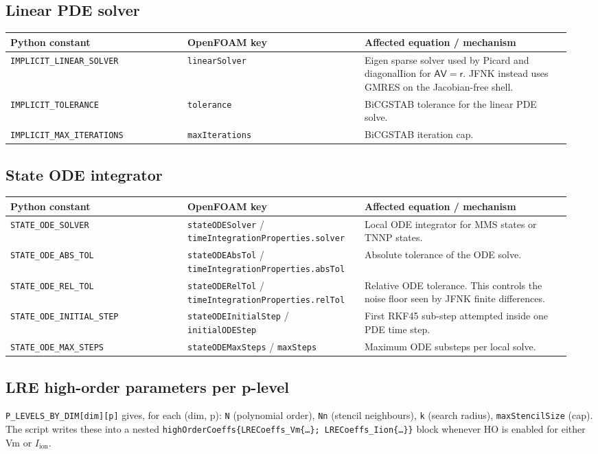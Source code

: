 \documentclass[11pt,a4paper]{article}
\newcommand{\Iion}{I_{\text{ion}}}
\newcommand{\Aimp}{\mathsf{A}}
\newcommand{\code}[1]{\texttt{\small #1}}
\begin{document}
\subsection{Linear PDE solver}
\begin{longtable}{@{}p{0.30\linewidth}p{0.30\linewidth}p{0.35\linewidth}@{}}
\toprule
Python constant & OpenFOAM key & Affected equation / mechanism \\
\midrule \endhead
\code{IMPLICIT\_LINEAR\_SOLVER} & \code{linearSolver} &
   Eigen sparse solver used by Picard and diagonalIion for
   $\Aimp\mathsf{V}=\mathsf{r}$. JFNK instead uses GMRES on the
   Jacobian-free shell. \\
\code{IMPLICIT\_TOLERANCE} & \code{tolerance} &
   BiCGSTAB tolerance for the linear PDE solve. \\
\code{IMPLICIT\_MAX\_ITERATIONS} & \code{maxIterations} &
   BiCGSTAB iteration cap. \\
\bottomrule
\end{longtable}

\subsection{State ODE integrator}
\begin{longtable}{@{}p{0.30\linewidth}p{0.30\linewidth}p{0.35\linewidth}@{}}
\toprule
Python constant & OpenFOAM key & Affected equation / mechanism \\
\midrule \endhead
\code{STATE\_ODE\_SOLVER} & \code{stateODESolver} /
   \code{timeIntegrationProperties.solver} &
   Local ODE integrator for MMS states or TNNP states. \\
\code{STATE\_ODE\_ABS\_TOL} & \code{stateODEAbsTol} /
   \code{timeIntegrationProperties.absTol} &
   Absolute tolerance of the ODE solve. \\
\code{STATE\_ODE\_REL\_TOL} & \code{stateODERelTol} /
   \code{timeIntegrationProperties.relTol} &
   Relative ODE tolerance. This controls the noise floor seen by JFNK
   finite differences. \\
\code{STATE\_ODE\_INITIAL\_STEP} & \code{stateODEInitialStep} /
   \code{initialODEStep} &
   First RKF45 sub-step attempted inside one PDE time step. \\
\code{STATE\_ODE\_MAX\_STEPS} & \code{stateODEMaxSteps} /
   \code{maxSteps} &
   Maximum ODE substeps per local solve. \\
\bottomrule
\end{longtable}

\subsection{LRE high-order parameters per p-level}
\code{P\_LEVELS\_BY\_DIM[dim][p]} gives, for each (dim, p):
\code{N} (polynomial order), \code{Nn} (stencil neighbours),
\code{k} (search radius), \code{maxStencilSize} (cap). The script
writes these into a nested
\code{highOrderCoeffs\{LRECoeffs\_Vm\{\dots\}; LRECoeffs\_Iion\{\dots\}\}}
block whenever HO is enabled for either Vm or $\Iion$.
\end{document}

